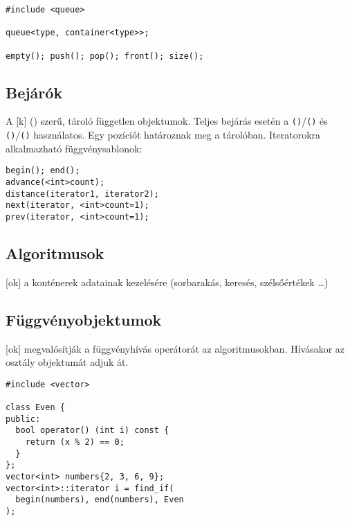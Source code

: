 \documentclass[../../main.tex]{subfiles}
\begin{document}
\begin{verbatim}
#include <queue>

queue<type, container<type>>;

empty(); push(); pop(); front(); size();
\end{verbatim}

\subsection{Bejárók}

A [k] ()  szerű, tároló független
objektumok. Teljes bejárás esetén a \texttt{()}/\texttt{()}
és \texttt{()}/\texttt{()} használatos. Egy pozíciót
határoznak meg a tárolóban. Iteratorokra alkalmazható függvénysablonok:

\begin{verbatim}
begin(); end();
advance(<int>count);
distance(iterator1, iterator2);
next(iterator, <int>count=1);
prev(iterator, <int>count=1);
\end{verbatim}

\subsection{Algoritmusok}

[ok] a konténerek adatainak kezelésére
(sorbarakás, keresés, szélsőértékek \dots)

\subsection{Függvényobjektumok}

[ok] megvalósítják a függvényhívás \blackc{()} operátorát
az algoritmusokban. Hívásakor az osztály objektumát adjuk át.

\begin{verbatim}
#include <vector>

class Even {
public:
  bool operator() (int i) const {
    return (x % 2) == 0;
  }
};
vector<int> numbers{2, 3, 6, 9};
vector<int>::iterator i = find_if(
  begin(numbers), end(numbers), Even
);
\end{verbatim}
\end{document}
